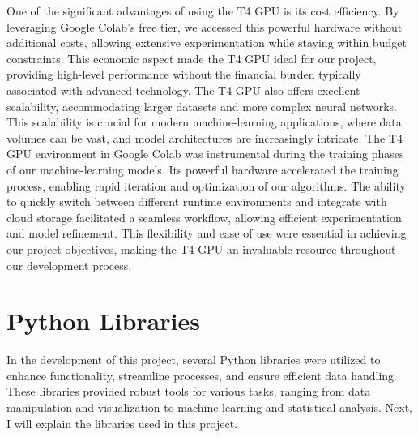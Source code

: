 One of the significant advantages of using the T4 GPU is its cost efficiency. By leveraging Google Colab's free tier, we accessed this powerful hardware without additional costs, allowing extensive experimentation while staying within budget constraints. This economic aspect made the T4 GPU ideal for our project, providing high-level performance without the financial burden typically associated with advanced technology. The T4 GPU also offers excellent scalability, accommodating larger datasets and more complex neural networks. This scalability is crucial for modern machine-learning applications, where data volumes can be vast, and model architectures are increasingly intricate. The T4 GPU environment in Google Colab was instrumental during the training phases of our machine-learning models. Its powerful hardware accelerated the training process, enabling rapid iteration and optimization of our algorithms. The ability to quickly switch between different runtime environments and integrate with cloud storage facilitated a seamless workflow, allowing efficient experimentation and model refinement. This flexibility and ease of use were essential in achieving our project objectives, making the T4 GPU an invaluable resource throughout our development process.

\section{Python Libraries}

In the development of this project, several Python libraries were utilized to enhance functionality, streamline processes, and ensure efficient data handling. These libraries provided robust tools for various tasks, ranging from data manipulation and visualization to machine learning and statistical analysis. Next, I will explain the libraries used in this project.


